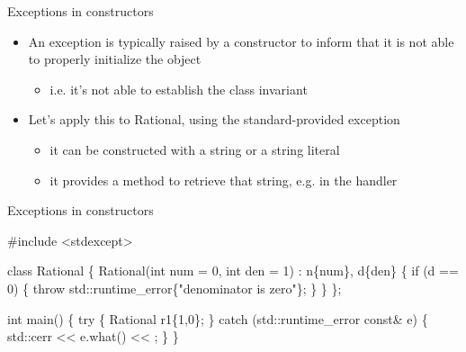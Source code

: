 \begin{frame}[fragile]{Exceptions in constructors}

  \begin{itemize}
  \item An exception is typically raised by a constructor to inform that it is
    not able to properly initialize the object
    \begin{itemize}
    \item i.e. it's not able to establish the class invariant
    \end{itemize}
  \item Let's apply this to Rational, using the standard-provided exception 
    \begin{itemize}
    \item it can be constructed with a string or a string literal
    \item it provides a  method to retrieve that string, e.g. in
      the handler
    \end{itemize}
  \end{itemize}

\end{frame}

\begin{frame}[fragile]{Exceptions in constructors \insertcontinuationtext}

    \begin{codeblock}
#include <stdexcept>

class Rational \{
  \ddd
  Rational(int num = 0, int den = 1) : n\{num\}, d\{den\} \{
    if (d == 0) \{
      \alert{throw} std::runtime_error\{"denominator is zero"\};
    \}
    \ddd
  \}
\};

int main() \{
  \alert{try} \{
    Rational r1\{1,0\};
    \ddd
  \} \alert{catch} (std::runtime_error const& e) \{
    std::cerr << e.what() << \bslashn;
  \}
\}\end{codeblock}

\end{frame}

